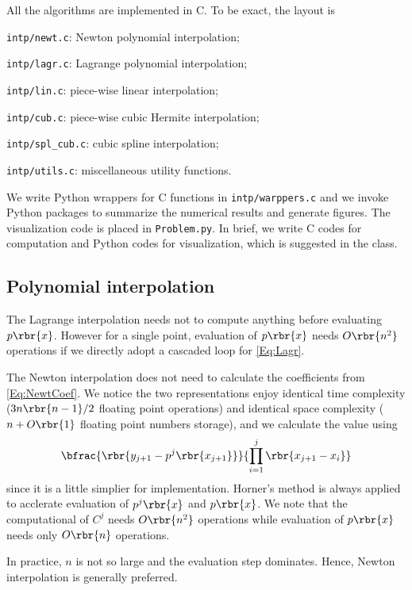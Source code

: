 \documentclass[english, nochinese]{pnote}
\begin{document}
All the algorithms are implemented in C. To be exact, the layout is
\begin{partlist}
\item \verb"intp/newt.c": Newton polynomial interpolation;
\item \verb"intp/lagr.c": Lagrange polynomial interpolation;
\item \verb"intp/lin.c": piece-wise linear interpolation;
\item \verb"intp/cub.c": piece-wise cubic Hermite interpolation;
\item \verb"intp/spl_cub.c": cubic spline interpolation;
\item \verb"intp/utils.c": miscellaneous utility functions.
\end{partlist}
We write Python wrappers for C functions in \verb"intp/warppers.c" and we invoke Python packages to summarize the numerical results and generate figures. The visualization code is placed in \verb"Problem.py". In brief, {\color{red} we write C codes for computation and Python codes for visualization, which is suggested in the class}.

\subsection{Polynomial interpolation}

The Lagrange interpolation needs not to compute anything before evaluating $ p \rbr{x} $. However for a single point, evaluation of $ p \rbr{x} $ needs $ O \rbr{n^2} $ operations if we directly adopt a cascaded loop for \eqref{Eq:Lagr}.

The Newton interpolation does not need to calculate the coefficients from \eqref{Eq:NewtCoef}. We notice the two representations enjoy identical time complexity ($ 3 n \rbr{ n - 1 } / 2 $ floating point operations) and identical space complexity ($ n + O \rbr{1} $ floating point numbers storage), and we calculate the value using
\begin{equation} \label{Eq:NewtRec}
\bfrac{\rbr{ y_{ j + 1 } - p^j \rbr{x_{ j + 1 }} }}{ \prod_{ i = 1 }^j \rbr{ x_{ j + 1 } - x_i } }
\end{equation}
since it is a little simplier for implementation. Horner's method is always applied to acclerate evaluation of $ p^j \rbr{x} $ and $ p \rbr{x} $. We note that the computational of $C^j$ needs $ O \rbr{n^2} $ operations while evaluation of $ p \rbr{x} $ needs only $ O \rbr{n} $ operations.

In practice, $n$ is not so large and the evaluation step dominates. Hence, Newton interpolation is generally preferred.
\end{document}
